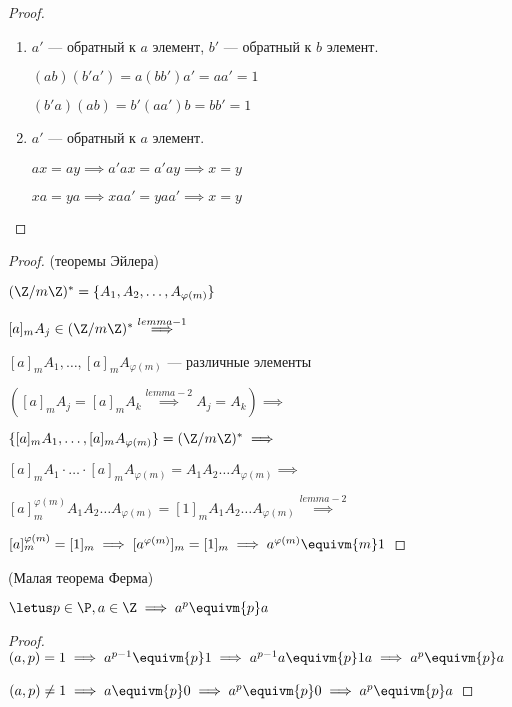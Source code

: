 \begin{proof}
    \begin{enumerate}
        \item $a'$ --- обратный к $a$ элемент, $b'$ --- обратный к $b$ элемент.
        
        $(ab)(b'a') = a(bb')a' = aa' = 1$
        
        $(b'a)(ab) = b'(aa')b = bb' = 1$
        
        \item $a'$ --- обратный к $a$ элемент.
        
        $ax = ay \implies a'ax = a'ay \implies x = y$
        
        $xa = ya \implies xaa' = yaa' \implies x = y$
    \end{enumerate}
\end{proof}

\begin{proof}(теоремы Эйлера)

    $(\Z/m\Z)^* = \{A_1, A_2, \ldots, A_{\varphi(m)}\}$
    
    $[a]_m A_j \in (\Z/m\Z)^* \overset{lemma-1}{\implies}$
    
    $[a]_m A_1, \ldots, [a]_m A_{\varphi(m)}$ --- различные элементы 
    
    $([a]_m A_j = [a]_m A_k \overset{lemma-2}{\implies} A_j = A_k) \implies$
    
    $\{[a]_m A_1, \ldots, [a]_m A_{\varphi(m)}\} = (\Z/m\Z)^* \implies$
    
    $[a]_m A_1 \cdot \ldots \cdot [a]_m A_{\varphi(m)} = A_1 A_2 \ldots A_{\varphi(m)} \implies$
    
    $[a]_m^{\varphi(m)} A_1 A_2 \ldots A_{\varphi(m)} = [1]_m A_1 A_2 \ldots A_{\varphi(m)} \overset{lemma-2}{\implies}$
    
    $[a]_m^{\varphi(m)} = [1]_m \implies [a^{\varphi(m)}]_m = [1]_m \implies a^{\varphi(m)} \equivm{m} 1$
\end{proof}

\begin{theorem}(Малая теорема Ферма)

    $\letus p \in \P, a \in \Z \implies a^p \equivm{p} a$
\end{theorem}

\begin{proof}

    $(a, p) = 1 \implies a^{p-1} \equivm{p} 1 \implies a^{p-1}a \equivm{p} 1a \implies a^p \equivm{p} a$

    $(a, p) \neq 1 \implies a \equivm{p} 0 \implies a^p \equivm{p} 0 \implies a^p \equivm{p} a$
\end{proof}

